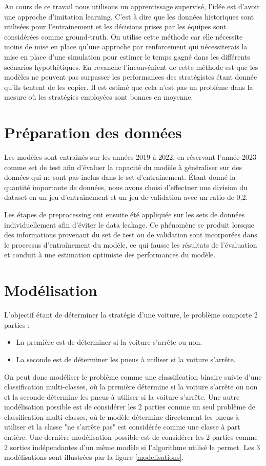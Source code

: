 Au cours de ce travail nous utilisons un apprentissage supervisé, l'idée est d'avoir une approche d'imitation learning.
C'est à dire que les données historiques sont utilisées pour l'entrainement et les décisions prises par les équipes sont considérées comme ground-truth.
On utilise cette méthode car elle nécessite moins de mise en place qu'une approche par renforcement qui nécessiterais la mise en place d'une simulation
pour estimer le temps gagné dans les différents scénarios hypothètiques.
En revanche l'inconvénient de cette méthode est que les modèles ne peuvent pas surpasser les performances des stratégistes étant donnée qu'ils tentent de les copier.
Il est estimé que cela n'est pas un problème dans la mesure où les stratégies employées sont bonnes en moyenne.

\section{Préparation des données}
Les modèles sont entrainés sur les années 2019 à 2022, en réservant l'année 2023 comme set de test afin d'évaluer la capacité du modèle à généraliser
sur des données qui ne sont pas inclus dans le set d'entrainement.
Étant donné la quantité importante de données, nous avons choisi d'effectuer une division du dataset en un jeu d'entraînement et un jeu de validation avec un ratio de 0,2.

Les étapes de preprocessing ont ensuite été appliquée sur les sets de données individuellement afin d'éviter le data leakage.
Ce phénomène se produit lorsque des informations provenant du set de test ou de validation sont incorporées dans le processus d'entraînement du modèle,
ce qui fausse les résultats de l'évaluation et conduit à une estimation optimiste des performances du modèle.

\section{Modélisation}
L'objectif étant de déterminer la stratégie d'une voiture, le problème comporte 2 parties :
\begin{itemize}
    \item La première est de déterminer si la voiture s'arrête ou non.
    \item La seconde est de déterminer les pneus à utiliser si la voiture s'arrête.
\end{itemize}
On peut donc modéliser le problème comme une classification binaire suivie d'une classification multi-classes,
où la première détermine si la voiture s'arrête ou non et la seconde détermine les pneus à utiliser si la voiture s'arrête.
Une autre modélisation possible est de considérer les 2 parties comme un seul problème de classification multi-classes,
où le modèle détermine directement les pneus à utiliser et la classe "ne s'arrête pas" est considérée comme une classe à part entière.
Une dernière modélisation possible est de considérer les 2 parties comme 2 sorties indépendantes d'un même modèle si l'algorithme utilisé le permet.
Les 3 modélisations sont illustrées par la figure \ref{modelisations}.

